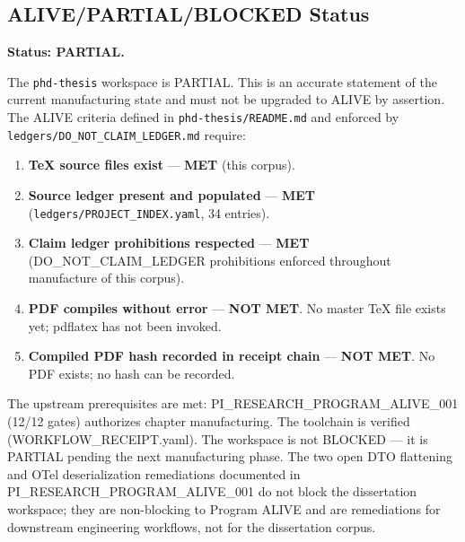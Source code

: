 \subsection{ALIVE/PARTIAL/BLOCKED Status}
\label{sec:phd-thesis-evidence-status}

\textbf{Status: PARTIAL.}

The \texttt{phd-thesis} workspace is PARTIAL. This is an accurate statement of the current
manufacturing state and must not be upgraded to ALIVE by assertion. The ALIVE criteria defined
in \texttt{phd-thesis/README.md} and enforced by \texttt{ledgers/DO\_NOT\_CLAIM\_LEDGER.md}
require:

\begin{enumerate}
  \item \textbf{TeX source files exist} --- \textbf{MET} (this corpus).
  \item \textbf{Source ledger present and populated} --- \textbf{MET}
    (\texttt{ledgers/PROJECT\_INDEX.yaml}, 34 entries).
  \item \textbf{Claim ledger prohibitions respected} --- \textbf{MET} (DO\_NOT\_CLAIM\_LEDGER
    prohibitions enforced throughout manufacture of this corpus).
  \item \textbf{PDF compiles without error} --- \textbf{NOT MET}. No master TeX file exists
    yet; pdflatex has not been invoked.
  \item \textbf{Compiled PDF hash recorded in receipt chain} --- \textbf{NOT MET}. No PDF
    exists; no hash can be recorded.
\end{enumerate}

The upstream prerequisites are met: PI\_RESEARCH\_PROGRAM\_ALIVE\_001 (12/12 gates) authorizes
chapter manufacturing. The toolchain is verified (WORKFLOW\_RECEIPT.yaml). The workspace is
not BLOCKED --- it is PARTIAL pending the next manufacturing phase. The two open DTO flattening
and OTel deserialization remediations documented in PI\_RESEARCH\_PROGRAM\_ALIVE\_001 do not
block the dissertation workspace; they are non-blocking to Program ALIVE and are remediations
for downstream engineering workflows, not for the dissertation corpus.
